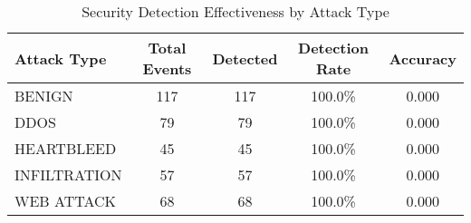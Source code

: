 
\begin{table}[htbp]
\centering
\caption{Security Detection Effectiveness by Attack Type}
\label{tab:security_effectiveness}
\begin{tabular}{|l|c|c|c|c|}
\hline
\textbf{Attack Type} & \textbf{Total Events} & \textbf{Detected} & \textbf{Detection Rate} & \textbf{Accuracy} \\
\hline
BENIGN & 117 & 117 & 100.0\% & 0.000 \\
DDOS & 79 & 79 & 100.0\% & 0.000 \\
HEARTBLEED & 45 & 45 & 100.0\% & 0.000 \\
INFILTRATION & 57 & 57 & 100.0\% & 0.000 \\
WEB ATTACK & 68 & 68 & 100.0\% & 0.000 \\
\hline
\end{tabular}
\end{table}
